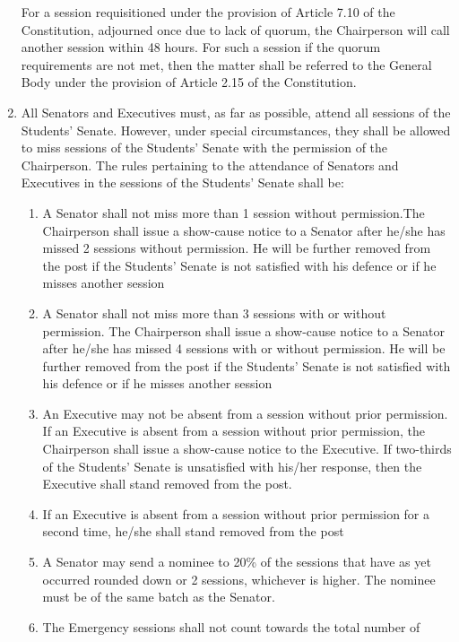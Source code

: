 \begin{enumerate}
  For a session requisitioned under the provision of Article 7.10 of the
  Constitution, adjourned once due to lack of quorum, the Chairperson
  will call another session within 48 hours. For such a session if the
  quorum requirements are not met, then the matter shall be referred to
  the General Body under the provision of Article 2.15 of the
  Constitution.
\item
  All Senators and Executives must, as far as possible, attend all
  sessions of the Students' Senate. However, under special
  circumstances, they shall be allowed to miss sessions of the Students'
  Senate with the permission of the Chairperson. The rules pertaining to
  the attendance of Senators and Executives in the sessions of the
  Students' Senate shall be:

  \begin{enumerate}
  \def\labelenumii{\alph{enumii}.}
  \item
    A Senator shall not miss more than 1 session without permission.The
    Chairperson shall issue a show-cause notice to a Senator after
    he/she has missed 2 sessions without permission. He will be further
    removed from the post if the Students' Senate is not satisfied with
    his defence or if he misses another session
  \item
    A Senator shall not miss more than 3 sessions with or without
    permission. The Chairperson shall issue a show-cause notice to a
    Senator after he/she has missed 4 sessions with or without
    permission. He will be further removed from the post if the
    Students' Senate is not satisfied with his defence or if he misses
    another session
  \item
    An Executive may not be absent from a session without prior
    permission. If an Executive is absent from a session without prior
    permission, the Chairperson shall issue a show-cause notice to the
    Executive. If two-thirds of the Students' Senate is unsatisfied with
    his/her response, then the Executive shall stand removed from the
    post.
  \item
    If an Executive is absent from a session without prior permission
    for a second time, he/she shall stand removed from the post
  \item
    A Senator may send a nominee to 20\% of the sessions that have as
    yet occurred rounded down or 2 sessions, whichever is higher. The
    nominee must be of the same batch as the Senator.
  \item
    The Emergency sessions shall not count towards the total number of

\end{enumerate}
\end{enumerate}
